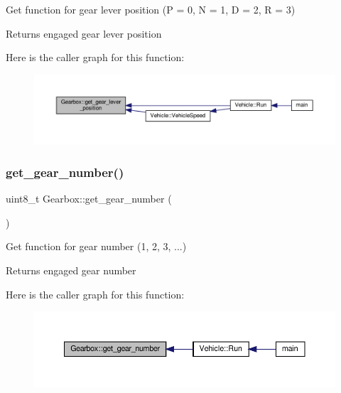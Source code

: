 Get function for gear lever position (P = 0, N = 1, D = 2, R = 3) \begin{DoxyReturn}{Returns}
engaged gear lever position 
\end{DoxyReturn}
Here is the caller graph for this function\+:
\nopagebreak
\begin{figure}[H]
\begin{center}
\leavevmode
\includegraphics[width=350pt]{classGearbox_a6e3e4eefa42a5811396aee1fad572adc_icgraph}
\end{center}
\end{figure}
\mbox{\label{classGearbox_afa81be24e956de8328e32fd1e361eff7}} 
\subsubsection{\texorpdfstring{get\+\_\+gear\+\_\+number()}{get\_gear\_number()}}
{\footnotesize\ttfamily uint8\+\_\+t Gearbox\+::get\+\_\+gear\+\_\+number (\begin{DoxyParamCaption}{ }\end{DoxyParamCaption})}

Get function for gear number (1, 2, 3, ...) \begin{DoxyReturn}{Returns}
engaged gear number 
\end{DoxyReturn}
Here is the caller graph for this function\+:
\nopagebreak
\begin{figure}[H]
\begin{center}
\leavevmode
\includegraphics[width=350pt]{classGearbox_afa81be24e956de8328e32fd1e361eff7_icgraph}
\end{center}
\end{figure}
\mbox{\label{classGearbox_ad53da0be7891d702873f2a97e0f49c3a}} 
